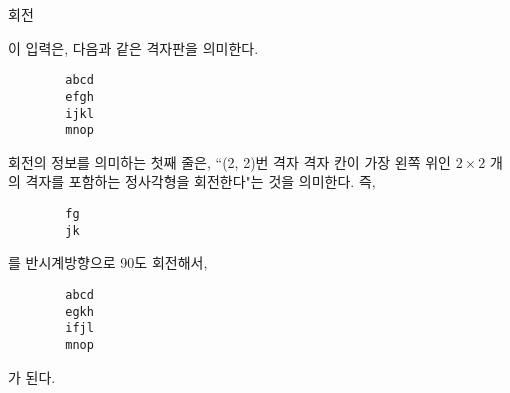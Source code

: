 \begin{problem}{회전}
	\Examples
	
	\begin{example}
	\end{example}
	
	이 입력은, 다음과 같은 격자판을 의미한다.
	
	\begin{verbatim} 
	    abcd
	    efgh
	    ijkl
	    mnop
	\end{verbatim}
	
	회전의 정보를 의미하는 첫째 줄은, ``(2, 2)번 격자 격자 칸이 가장 왼쪽 위인 $2 \times 2$ 개의 격자를 포함하는 정사각형을 회전한다"는 것을 의미한다. 즉,
	
	\begin{verbatim}
	    fg
	    jk
	\end{verbatim}
	를 반시계방향으로 90도 회전해서, 

	\begin{verbatim}
	    abcd
	    egkh
	    ifjl
	    mnop
	\end{verbatim}
	
	가 된다.
	
\end{problem}
